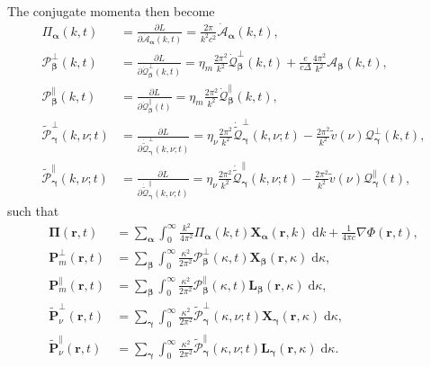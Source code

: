 \documentclass{article}
\begin{document}
The conjugate momenta then become
\begin{equation}
\begin{split}
\mathit{\Pi}_{\bm{\alpha}}(k,t) &= \frac{\partial L}{\partial \dot{\mathcal{A}}_{\bm{\alpha}}(k,t)} = \frac{2\pi}{k^2c^2}\dot{\mathcal{A}}_{\bm{\alpha}}(k,t),\\
\mathcal{P}_{\bm{\beta}}^\perp(k,t) &= \frac{\partial L}{\partial \dot{\mathcal{Q}}_{\bm{\beta}}^\perp(k,t)} = \eta_m\frac{2\pi^2}{k^2}\dot{\mathcal{Q}}_{\bm{\beta}}^\perp(k,t) + \frac{e}{c\Delta}\frac{4\pi^2}{k^2}\mathcal{A}_{\bm{\beta}}(k,t),\\
\mathcal{P}_{\bm{\beta}}^\parallel(k,t) &= \frac{\partial L}{\partial \dot{\mathcal{Q}}_{\bm{\beta}}^\parallel(t)} = \eta_m\frac{2\pi^2}{k^2}\dot{\mathcal{Q}}_{\bm{\beta}}^\parallel(k,t),\\
\tilde{\mathcal{P}}_{\bm{\gamma}}^\perp(k,\nu;t) &= \frac{\partial L}{\partial \dot{\tilde{\mathcal{Q}}}_{\bm{\gamma}}^\perp(k,\nu;t)} = \eta_\nu\frac{2\pi^2}{k^2}\dot{\tilde{\mathcal{Q}}}_{\bm{\gamma}}^\perp(k,\nu;t) - \frac{2\pi^2}{k^2}\tilde{v}(\nu)\mathcal{Q}_{\bm{\gamma}}^\perp(k,t),\\
\tilde{\mathcal{P}}_{\bm{\gamma}}^\parallel(k,\nu;t) &= \frac{\partial L}{\partial \dot{\tilde{\mathcal{Q}}}_{\bm{\gamma}}^\parallel(k,\nu;t)} = \eta_\nu \frac{2\pi^2}{k^2}\dot{\tilde{\mathcal{Q}}}_{\bm{\gamma}}^\parallel(k,\nu;t) - \frac{2\pi^2}{k^2}\tilde{v}(\nu)\mathcal{Q}_{\bm{\gamma}}^\parallel(t),
\end{split}
\end{equation}
such that
\begin{equation}
\begin{split}
\bm{\Pi}(\mathbf{r},t) &= \sum_{\bm{\alpha}}\int_0^\infty \frac{k^2}{4\pi^2}\mathit{\Pi}_{\bm{\alpha}}(k,t)\mathbf{X}_{\bm{\alpha}}(\mathbf{r},k)\;\mathrm{d}k + \frac{1}{4\pi c}\nabla\Phi(\mathbf{r},t),\\
\mathbf{P}_m^\perp(\mathbf{r},t) &= \sum_{\bm{\beta}}\int_0^\infty\frac{\kappa^2}{2\pi^2}\mathcal{P}_{\bm{\beta}}^\perp(\kappa,t)\mathbf{X}_{\bm{\beta}}(\mathbf{r},\kappa)\;\mathrm{d}\kappa,\\
\mathbf{P}_m^\parallel(\mathbf{r},t) &= \sum_{\bm{\beta}}\int_0^\infty\frac{\kappa^2}{2\pi^2}\mathcal{P}_{\bm{\beta}}^\parallel(\kappa,t)\mathbf{L}_{\bm{\beta}}(\mathbf{r},\kappa)\;\mathrm{d}\kappa,\\
\tilde{\mathbf{P}}_\nu^\perp(\mathbf{r},t) &= \sum_{\bm{\gamma}}\int_0^\infty\frac{\kappa^2}{2\pi^2}\tilde{\mathcal{P}}_{\bm{\gamma}}^\perp(\kappa,\nu;t)\mathbf{X}_{\bm{\gamma}}(\mathbf{r},\kappa)\;\mathrm{d}\kappa,\\
\tilde{\mathbf{P}}_\nu^\parallel(\mathbf{r},t) &= \sum_{\bm{\gamma}}\int_0^\infty\frac{\kappa^2}{2\pi^2}\tilde{\mathcal{P}}_{\bm{\gamma}}^\parallel(\kappa,\nu;t)\mathbf{L}_{\bm{\gamma}}(\mathbf{r},\kappa)\;\mathrm{d}\kappa.
\end{split}
\end{equation}
\end{document}
